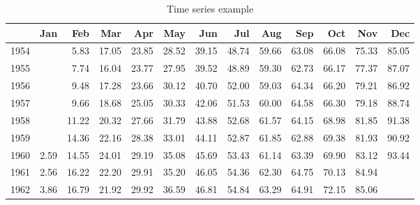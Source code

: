 \documentclass{article}
\begin{document}
\begin{table}[htb]
\begin{center}
\begin{tabular}{rrrrrrrrrrrrr}
\hline
 & Jan & Feb & Mar & Apr & May & Jun & Jul & Aug & Sep & Oct & Nov & Dec \\
\hline
1954 &  & 5.83 & 17.05 & 23.85 & 28.52 & 39.15 & 48.74 & 59.66 & 63.08 & 66.08 & 75.33 & 85.05 \\
1955 &  & 7.74 & 16.04 & 23.77 & 27.95 & 39.52 & 48.89 & 59.30 & 62.73 & 66.17 & 77.37 & 87.07 \\
1956 &  & 9.48 & 17.28 & 23.66 & 30.12 & 40.70 & 52.00 & 59.03 & 64.34 & 66.20 & 79.21 & 86.92 \\
1957 &  & 9.66 & 18.68 & 25.05 & 30.33 & 42.06 & 51.53 & 60.00 & 64.58 & 66.30 & 79.18 & 88.74 \\
1958 &  & 11.22 & 20.32 & 27.66 & 31.79 & 43.88 & 52.68 & 61.57 & 64.15 & 68.98 & 81.85 & 91.38 \\
1959 &  & 14.36 & 22.16 & 28.38 & 33.01 & 44.11 & 52.87 & 61.85 & 62.88 & 69.38 & 81.93 & 90.92 \\
1960 & 2.59 & 14.55 & 24.01 & 29.19 & 35.08 & 45.69 & 53.43 & 61.14 & 63.39 & 69.90 & 83.12 & 93.44 \\
1961 & 2.56 & 16.22 & 22.20 & 29.91 & 35.20 & 46.05 & 54.36 & 62.30 & 64.75 & 70.13 & 84.94 &  \\
1962 & 3.86 & 16.79 & 21.92 & 29.92 & 36.59 & 46.81 & 54.84 & 63.29 & 64.91 & 72.15 & 85.06 &  \\
\hline
\end{tabular}
\caption{Time series example}
\end{center}
\end{table}
\end{document}
